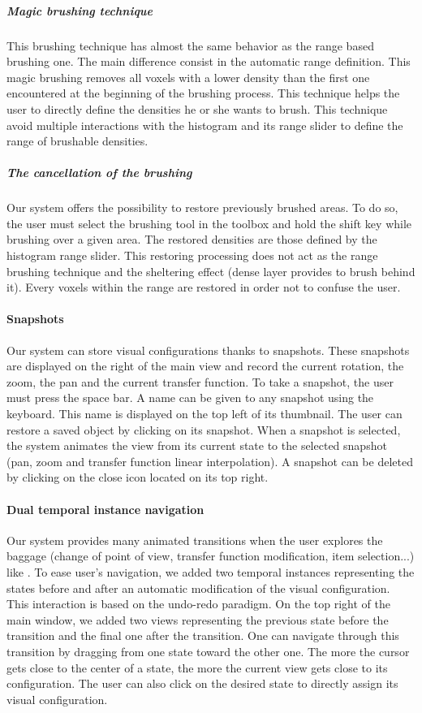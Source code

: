 \subparagraph{Magic brushing technique}
This brushing technique has almost the same behavior as the range based brushing one. The main difference consist in the automatic range definition. This magic brushing removes all voxels with a lower density than the first one encountered at the beginning of the brushing process. This technique helps the user to directly define the densities he or she wants to brush. This technique avoid multiple interactions with the histogram and its range slider to define the range of brushable densities.

\subparagraph{The cancellation of the brushing}
Our system offers the possibility to restore previously brushed areas. To do so, the user must select the brushing tool in the toolbox and hold the shift key while brushing over a given area. The restored densities are those defined by the histogram range slider. This restoring processing does not act as the range brushing technique and the sheltering effect (dense layer provides to brush behind it). Every voxels within the range are restored in order not to confuse the user.

\paragraph{Snapshots}
Our system can store visual configurations thanks to snapshots. These snapshots are displayed on the right of the main view and record the current rotation, the zoom, the pan and the current transfer function.
To take a snapshot, the user must press the space bar. A name can be given to any snapshot using the keyboard. This name is displayed on the top left of its thumbnail. The user can restore a saved object by clicking on its snapshot. When a snapshot is selected, the system animates the view from its current state to the selected snapshot (pan, zoom and transfer function linear interpolation). A snapshot can be deleted by clicking on the close icon located on its top right.

\paragraph{Dual temporal instance navigation}

Our system provides many animated transitions when the user explores the baggage (change of point of view, transfer function modification, item selection...) like \cite{tversky_animation:_2002}. To ease user’s navigation, we added two temporal instances representing the states before and after an automatic modification of the visual configuration. This interaction is based on the undo-redo paradigm. On the top right of the main window, we added two views representing the previous state before the transition and the final one after the transition. One can navigate through this transition by dragging from one state toward the other one. The more the cursor gets close to the center of a state, the more the current view gets close to its configuration. The user can also click on the desired state to directly assign its visual configuration.

